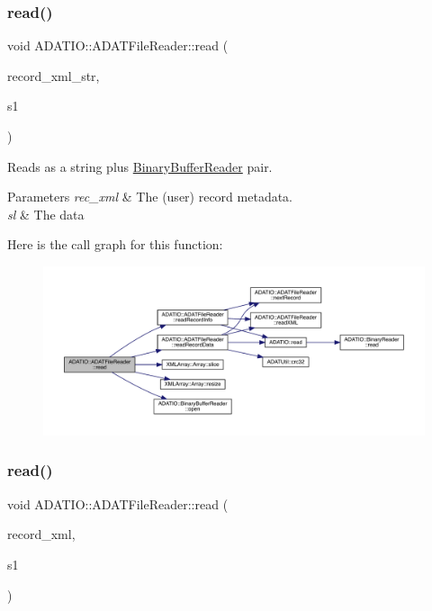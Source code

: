 \subsubsection{\texorpdfstring{read()}{read()}\hspace{0.1cm}{\footnotesize\ttfamily [3/7]}}
{\footnotesize\ttfamily void A\+D\+A\+T\+I\+O\+::\+A\+D\+A\+T\+File\+Reader\+::read (\begin{DoxyParamCaption}\item[{std\+::string \&}]{record\+\_\+xml\+\_\+str,  }\item[{\mbox{\hyperlink{classADATIO_1_1BinaryBufferReader}{Binary\+Buffer\+Reader}} \&}]{s1 }\end{DoxyParamCaption})}



Reads as a string plus \mbox{\hyperlink{classADATIO_1_1BinaryBufferReader}{Binary\+Buffer\+Reader}} pair. 


\begin{DoxyParams}{Parameters}
{\em rec\+\_\+xml} & The (user) record metadata. \\
\hline
{\em sl} & The data \\
\hline
\end{DoxyParams}
Here is the call graph for this function\+:\nopagebreak
\begin{figure}[H]
\begin{center}
\leavevmode
\includegraphics[width=350pt]{db/de5/group__qio_ga2179348a566e0224ed2122acfabf8bc9_cgraph}
\end{center}
\end{figure}
\mbox{\label{group__qio_gadf1e0b4405e14798a0610efd8774f8d0}} 
\subsubsection{\texorpdfstring{read()}{read()}\hspace{0.1cm}{\footnotesize\ttfamily [4/7]}}
{\footnotesize\ttfamily void A\+D\+A\+T\+I\+O\+::\+A\+D\+A\+T\+File\+Reader\+::read (\begin{DoxyParamCaption}\item[{\mbox{\hyperlink{classADATXML_1_1XMLReader}{X\+M\+L\+Reader}} \&}]{record\+\_\+xml,  }\item[{\mbox{\hyperlink{classADATIO_1_1BinaryBufferReader}{Binary\+Buffer\+Reader}} \&}]{s1 }\end{DoxyParamCaption})}



